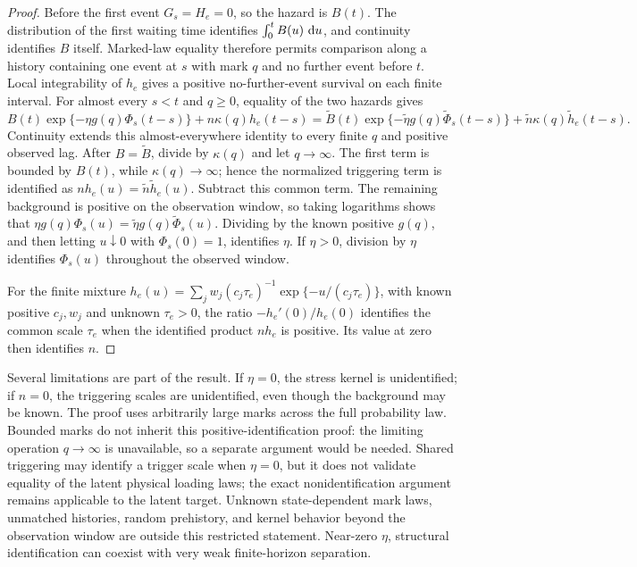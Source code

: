 \begin{proof}
Before the first event \(G_s=H_e=0\), so the hazard is \(B(t)\). The distribution of the first waiting time identifies \(\int_0^tB(u)\,\mathop{}\!\mathrm{d} u\), and continuity identifies \(B\) itself. Marked-law equality therefore permits comparison along a history containing one event at \(s\) with mark \(q\) and no further event before \(t\). Local integrability of \(h_e\) gives a positive no-further-event survival on each finite interval. For almost every \(s< t\) and \(q\ge0\), equality of the two hazards gives
\[
B(t)\exp\{-\eta g(q)\Phi_s(t-s)\}+n\kappa(q)h_e(t-s)
=
\widetilde B(t)\exp\{-\widetilde\eta g(q)\widetilde\Phi_s(t-s)\}
+\widetilde n\kappa(q)\widetilde h_e(t-s).
\]
Continuity extends this almost-everywhere identity to every finite \(q\) and positive observed lag. After \(B=\widetilde B\), divide by \(\kappa(q)\) and let \(q\to\infty\). The first term is bounded by \(B(t)\), while \(\kappa(q)\to\infty\); hence the normalized triggering term is identified as \(n h_e(u)=\widetilde n\widetilde h_e(u)\). Subtract this common term. The remaining background is positive on the observation window, so taking logarithms shows that \(\eta g(q)\Phi_s(u)=\widetilde\eta g(q)\widetilde\Phi_s(u)\). Dividing by the known positive \(g(q)\), and then letting \(u\downarrow0\) with \(\Phi_s(0)=1\), identifies \(\eta\). If \(\eta>0\), division by \(\eta\) identifies \(\Phi_s(u)\) throughout the observed window.

For the finite mixture \(h_e(u)=\sum_j w_j(c_j\tau_e)^{-1}\exp\{-u/(c_j\tau_e)\}\), with known positive \(c_j,w_j\) and unknown \(\tau_e>0\), the ratio \(-h_e'(0)/h_e(0)\) identifies the common scale \(\tau_e\) when the identified product \(n h_e\) is positive. Its value at zero then identifies \(n\).
\end{proof}

Several limitations are part of the result. If \(\eta=0\), the stress kernel is unidentified; if \(n=0\), the triggering scales are unidentified, even though the background may be known. The proof uses arbitrarily large marks across the full probability law. Bounded marks do not inherit this positive-identification proof: the limiting operation \(q\to\infty\) is unavailable, so a separate argument would be needed. Shared triggering may identify a trigger scale when \(\eta=0\), but it does not validate equality of the latent physical loading laws; the exact nonidentification argument remains applicable to the latent target. Unknown state-dependent mark laws, unmatched histories, random prehistory, and kernel behavior beyond the observation window are outside this restricted statement. Near-zero \(\eta\), structural identification can coexist with very weak finite-horizon separation.

